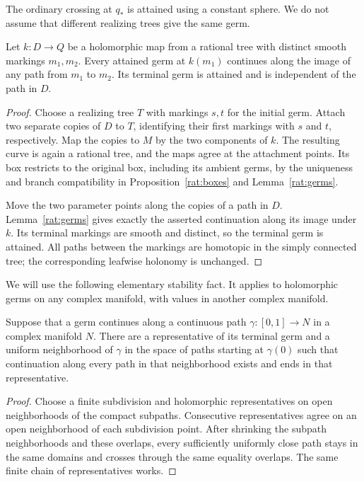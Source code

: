 The ordinary crossing at \(q_*\) is attained using a constant sphere.
We do not assume that different realizing trees give the same germ.

\begin{lemma}\label{cross:tree-path}
Let \(k:D\to Q\) be a holomorphic map from a rational tree with distinct
smooth markings \(m_1,m_2\). Every attained germ at \(k(m_1)\) continues
along the image of any path from \(m_1\) to \(m_2\). Its terminal germ
is attained and is independent of the path in \(D\).
\end{lemma}
\begin{proof}
Choose a realizing tree \(T\) with markings \(s,t\) for the initial
germ. Attach two separate copies of \(D\) to \(T\), identifying their
first markings with \(s\) and \(t\), respectively. Map the copies to
\(M\) by the two components of \(k\). The resulting curve is again a
rational tree, and the maps agree at the attachment points. Its box
restricts to the original box, including its ambient germs, by the
uniqueness and branch compatibility in Proposition~\ref{rat:boxes}
and Lemma~\ref{rat:germs}.

Move the two parameter points along the copies of a path in \(D\).
Lemma~\ref{rat:germs} gives exactly the asserted continuation along
its image under \(k\). Its terminal markings are smooth and distinct,
so the terminal germ is attained. All paths between the markings are
homotopic in the simply connected tree; the corresponding leafwise
holonomy is unchanged.
\end{proof}

We will use the following elementary stability fact. It applies to
holomorphic germs on any complex manifold, with values in another complex
manifold.

\begin{lemma}\label{cross:stability}
Suppose that a germ continues along a continuous path \(\gamma:[0,1]\to N\)
in a complex manifold \(N\). There are a representative of its terminal
germ and a uniform neighborhood of \(\gamma\) in the space of paths
starting at \(\gamma(0)\) such that continuation along every path in that
neighborhood exists and ends in that representative.
\end{lemma}
\begin{proof}
Choose a finite subdivision and holomorphic representatives on open
neighborhoods of the compact subpaths. Consecutive representatives agree
on an open neighborhood of each subdivision point. After shrinking the
subpath neighborhoods and these overlaps, every sufficiently uniformly
close path stays in the same domains and crosses through the same
equality overlaps. The same finite chain of representatives works.
\end{proof}

